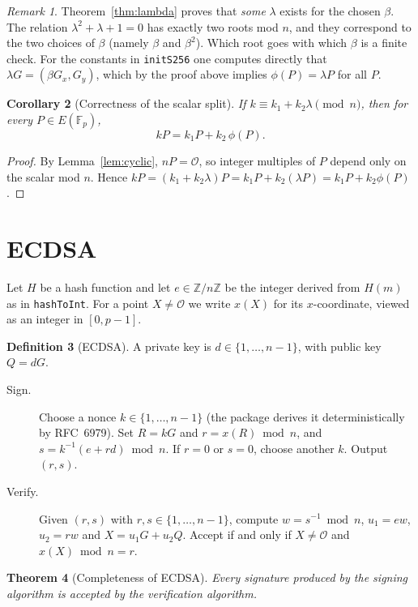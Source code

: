 \documentclass[11pt]{article}
\newtheorem{theorem}{Theorem}
\newtheorem{corollary}[theorem]{Corollary}
\theoremstyle{definition}
\newtheorem{definition}[theorem]{Definition}
\theoremstyle{remark}
\newtheorem{remark}[theorem]{Remark}
\newcommand{\F}{\mathbb{F}}
\newcommand{\Z}{\mathbb{Z}}
\newcommand{\Oinf}{\mathcal{O}}
\begin{document}
\begin{remark}
Theorem~\ref{thm:lambda} proves that \emph{some} $\lambda$ exists for the
chosen $\beta$. The relation $\lambda^2+\lambda+1=0$ has exactly two roots mod
$n$, and they correspond to the two choices of $\beta$ (namely $\beta$ and
$\beta^2$). Which root goes with which $\beta$ is a finite check. For the
constants in \texttt{initS256} one computes directly that
$\lambda G = (\beta G_x, G_y)$, which by the proof above implies
$\phi(P)=\lambda P$ for all $P$.
\end{remark}

\begin{corollary}[Correctness of the scalar split]\label{cor:glv}
If $k\equiv k_1+k_2\lambda\pmod n$, then for every $P\in E(\F_p)$,
\[
  kP = k_1P + k_2\,\phi(P).
\]
\end{corollary}

\begin{proof}
By Lemma~\ref{lem:cyclic}, $nP=\Oinf$, so integer multiples of $P$ depend only on
the scalar mod $n$. Hence
$kP=(k_1+k_2\lambda)P = k_1P + k_2(\lambda P) = k_1P + k_2\phi(P)$.
\end{proof}

\section{ECDSA}

Let $H$ be a hash function and let $e\in\Z/n\Z$ be the integer derived from
$H(m)$ as in \texttt{hashToInt}. For a point $X\ne\Oinf$ we write $x(X)$ for its
$x$-coordinate, viewed as an integer in $[0,p-1]$.

\begin{definition}[ECDSA]
A private key is $d\in\{1,\dots,n-1\}$, with public key $Q=dG$.
\begin{description}
\item[Sign.] Choose a nonce $k\in\{1,\dots,n-1\}$ (the package derives it
deterministically by RFC~6979). Set $R=kG$ and $r = x(R)\bmod n$, and
$s = k^{-1}(e+rd)\bmod n$. If $r=0$ or $s=0$, choose another $k$. Output
$(r,s)$.
\item[Verify.] Given $(r,s)$ with $r,s\in\{1,\dots,n-1\}$, compute
$w=s^{-1}\bmod n$, $u_1=ew$, $u_2=rw$ and $X=u_1G+u_2Q$. Accept if and only if
$X\ne\Oinf$ and $x(X)\bmod n = r$.
\end{description}
\end{definition}

\begin{theorem}[Completeness of ECDSA]\label{thm:ecdsa}
Every signature produced by the signing algorithm is accepted by the
verification algorithm.
\end{theorem}
\end{document}
